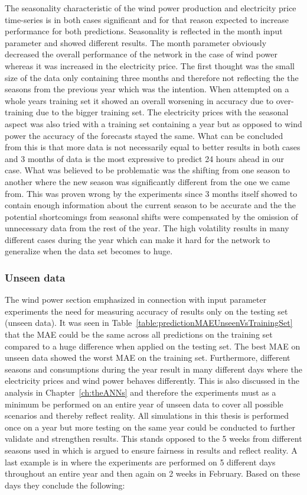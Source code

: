 The seasonality characteristic of the wind power production and electricity price time-series is in both cases significant and for that reason expected to increase performance for both predictions. Seasonality is reflected in the month input parameter and showed different results. The month parameter obviously decreased the overall performance of the network in the case of wind power whereas it was increased in the electricity price. The first thought was the small size of the data only containing three months and therefore not reflecting the the seasons from the previous year which was the intention. When attempted on a whole years training set it showed an overall worsening in accuracy due to over-training due to the bigger training set. The electricity prices with the seasonal aspect was also tried with a training set containing a year but as opposed to wind power the accuracy of the forecasts stayed the same. What can be concluded from this is that more data is not necessarily equal to better results in both cases and 3 months of data is the most expressive to predict 24 hours ahead in our case. What was believed to be problematic was the shifting from one season to another where the new season was significantly different from the one we came from. This was proven wrong by the experiments since 3 months itself showed to contain enough information about the current season to be accurate and the the potential shortcomings from seasonal shifts were compensated by the omission of unnecessary data from the rest of the year. The high volatility results in many different cases during the year which can make it hard for the network to generalize when the data set becomes to huge.

\subsubsection{Unseen data}
\label{sec:unseenDataDiscussion}
The wind power section emphasized in connection with input parameter experiments the need for measuring accuracy of results only on the testing set (unseen data). It was seen in Table~\ref{table:predictionMAEUnseenVsTrainingSet} that the MAE could be the same across all predictions on the training set compared to a huge difference when applied on the testing set. The best MAE on unseen data showed the worst MAE on the training set. Furthermore, different seasons and consumptions during the year result in many different days where the electricity prices and wind power behaves differently. This is also discussed in the analysis in Chapter~\ref{ch:theANNs} and therefore the experiments must as a minimum be performed on an entire year of unseen data to cover all possible scenarios and thereby reflect reality. All simulations in this thesis is performed once on a year but more testing on the same year could be conducted to further validate and strengthen results. This stands opposed to the 5 weeks from different seasons used in \cite{1} which is argued to ensure fairness in results and reflect reality. A last example is in \cite{pjmForecast} where the experiments are performed on 5 different days throughout an entire year and then again on 2 weeks in February. Based on these days they conclude the following:

